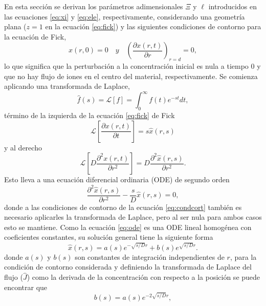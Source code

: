 En esta sección se derivan los parámetros adimensionales $\Xi$ y $\ell$ 
introducidos en las ecuaciones \ref{eq:xi} y \ref{eq:ele}, respectivamente, considerando una 
geometría
plana ($z = 1$ en la ecuación \ref{eq:fick}) y las siguientes condiciones de 
contorno para la ecuación de Fick,
\begin{equation}\label{eq:condcort}
    x(r, 0) = 0 \quad y \quad \left(\frac{\partial x(r, t)}{\partial r}\right)_{r=d} = 0,
\end{equation}
lo que significa que la perturbación a la concentración inicial es nula a tiempo
0 y que no hay flujo de iones en el centro del material, respectivamente. Se 
comienza aplicando una transformada de Laplace,
\begin{equation}\label{eq:laplace}
    \hat{f}(s) = \mathcal{L}[f] = \int_0^{\infty} f(t) e^{-s t} dt,
\end{equation}
término de la izquierda de la ecuación \ref{eq:fick} de Fick 
\begin{equation}
    \mathcal{L}\left[\frac{\partial x(r, t)}{\partial t}\right] = s \hat{x}(r, s)
\end{equation}
y al derecho
\begin{equation}
    \mathcal{L}\left[D \frac{\partial^2 x(r, t)}{\partial r^2}\right] = D \frac{\partial^2 \hat{x}(r, s)}{\partial r^2}.
\end{equation}
Esto lleva a una ecuación diferencial ordinaria (ODE) de segundo orden
\begin{equation}\label{eq:ode}
    \frac{\partial^2 \hat{x}(r, s)}{\partial r^2} - \frac{s}{D} \hat{x}(r, s) = 0,
\end{equation}
donde a las condiciones de contorno de la ecuación \ref{eq:condcort} también es 
necesario aplicarles la transformada de Laplace, pero al ser nula para ambos casos
esto se mantiene. Como la ecuación \ref{eq:ode} es una ODE lineal homogénea con 
coeficientes constantes, su solución general tiene la siguiente forma
\begin{equation}
    \hat{x}(r, s) = a(s) e^{-\sqrt{s/D}r} + b(s) e^{\sqrt{s/D}r}.
\end{equation}
donde $a(s)$ y $b(s)$ son constantes de integración independientes de $r$, para 
la condición de contorno considerada y definiendo la transformada de Laplace del 
flujo ($\hat{J}$) como la derivada de la concentración con respecto a la posición
se puede encontrar que 
\begin{equation}
    b(s) = a(s) e^{-2 \sqrt{s/D} r},
\end{equation}
